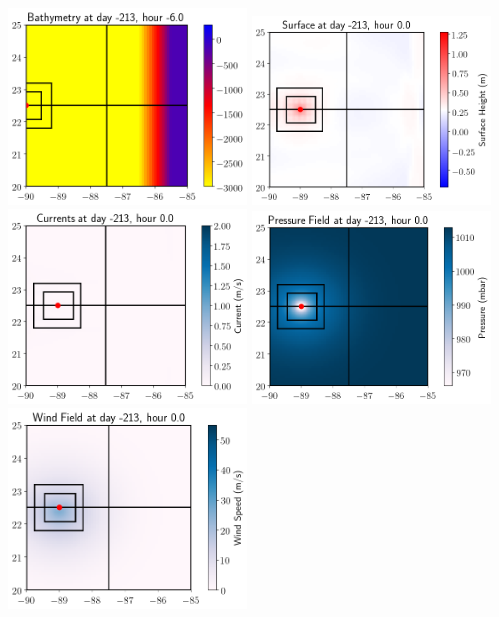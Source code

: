 \documentclass[11pt]{article}
\begin{document}
\vskip 10pt 
\includegraphics[width=0.475\textwidth]{frame0001fig301.png}
\vskip 10pt 
\includegraphics[width=0.475\textwidth]{frame0002fig0.png}
\includegraphics[width=0.475\textwidth]{frame0002fig1.png}
\vskip 10pt 
\includegraphics[width=0.475\textwidth]{frame0002fig2.png}
\includegraphics[width=0.475\textwidth]{frame0002fig4.png}
\end{document}
